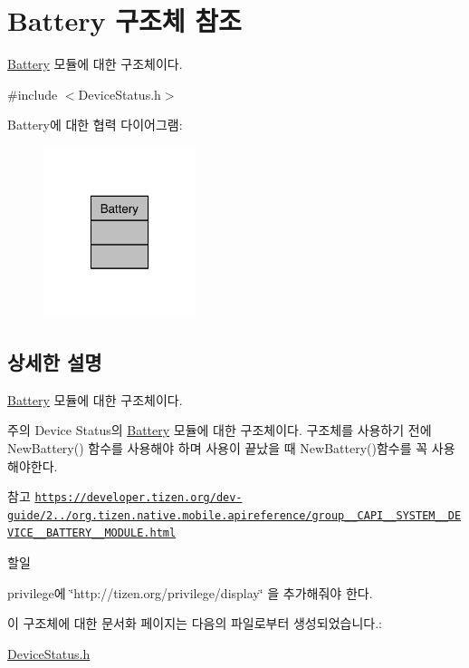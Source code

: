 \hypertarget{struct_battery}{\section{Battery 구조체 참조}
\label{struct_battery}
}


\hyperlink{struct_battery}{Battery} 모듈에 대한 구조체이다.  




{\ttfamily \#include $<$Device\-Status.\-h$>$}



Battery에 대한 협력 다이어그램\-:\nopagebreak
\begin{figure}[H]
\begin{center}
\leavevmode
\includegraphics[width=126pt]{struct_battery__coll__graph}
\end{center}
\end{figure}


\subsection{상세한 설명}
\hyperlink{struct_battery}{Battery} 모듈에 대한 구조체이다. 

\begin{DoxyNote}{주의}
Device Status의 \hyperlink{struct_battery}{Battery} 모듈에 대한 구조체이다. 구조체를 사용하기 전에 New\-Battery() 함수를 사용해야 하며 사용이 끝났을 때 New\-Battery()함수를 꼭 사용해야한다. 
\end{DoxyNote}
\begin{DoxySeeAlso}{참고}
\href{https://developer.tizen.org/dev-guide/2.3.0/org.tizen.native.mobile.apireference/group__CAPI__SYSTEM__DEVICE__BATTERY__MODULE.html}{\tt https\-://developer.\-tizen.\-org/dev-\/guide/2../org.\-tizen.\-native.\-mobile.\-apireference/group\-\_\-\-\_\-\-C\-A\-P\-I\-\_\-\-\_\-\-S\-Y\-S\-T\-E\-M\-\_\-\-\_\-\-D\-E\-V\-I\-C\-E\-\_\-\-\_\-\-B\-A\-T\-T\-E\-R\-Y\-\_\-\-\_\-\-M\-O\-D\-U\-L\-E.\-html} 
\end{DoxySeeAlso}
\begin{DoxyRefDesc}{할일}
\item[\hyperlink{todo__todo000006}{할일}]privilege에 \char`\"{}http\-://tizen.\-org/privilege/display\char`\"{} 을 추가해줘야 한다. \end{DoxyRefDesc}


이 구조체에 대한 문서화 페이지는 다음의 파일로부터 생성되었습니다.\-:\begin{DoxyCompactItemize}
\item 
\hyperlink{_device_status_8h}{Device\-Status.\-h}\end{DoxyCompactItemize}
